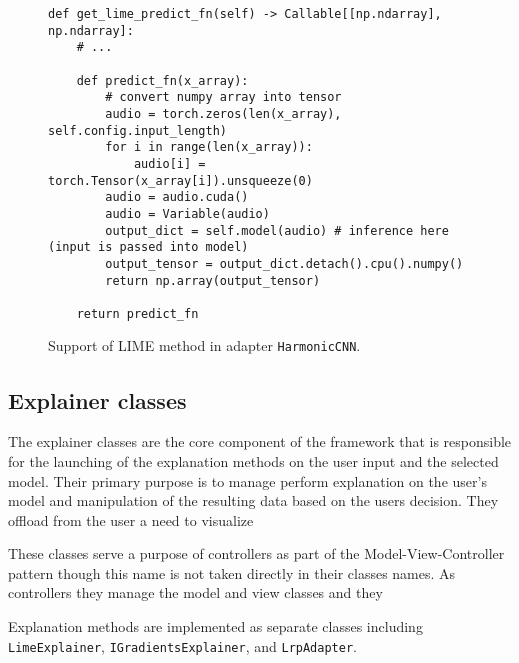 \documentclass[
    bindingoffset=5mm,  %
    footnoteindent=3mm, %
    hyphenation=true    %
]{src/wut-thesis}
\begin{document}
\begin{figure}%
\begin{verbatim}
def get_lime_predict_fn(self) -> Callable[[np.ndarray], np.ndarray]:
    # ...

    def predict_fn(x_array):
        # convert numpy array into tensor
        audio = torch.zeros(len(x_array), self.config.input_length)
        for i in range(len(x_array)):
            audio[i] = torch.Tensor(x_array[i]).unsqueeze(0)
        audio = audio.cuda()
        audio = Variable(audio)
        output_dict = self.model(audio) # inference here (input is passed into model)
        output_tensor = output_dict.detach().cpu().numpy()
        return np.array(output_tensor)

    return predict_fn
\end{verbatim}
\caption{Support of LIME method in adapter \texttt{HarmonicCNN}.}
\label{fig:HarmonicLLIMEOverload}
\end{figure}


\subsection{Explainer classes}

The explainer classes are the core component of the framework that is responsible
for the launching of the explanation methods on the user input and the
selected model. Their primary purpose is to manage perform explanation
on the user's model and manipulation of the resulting data based on the users decision.
They offload from the user a need to visualize 

These classes serve a purpose of controllers as part of the Model-View-Controller
pattern though this name is not taken directly in their classes names.
As controllers they manage the model and view classes and they

Explanation methods are implemented as separate classes including \texttt{LimeExplainer},
\texttt{IGradientsExplainer}, and \texttt{LrpAdapter}.
\end{document}
